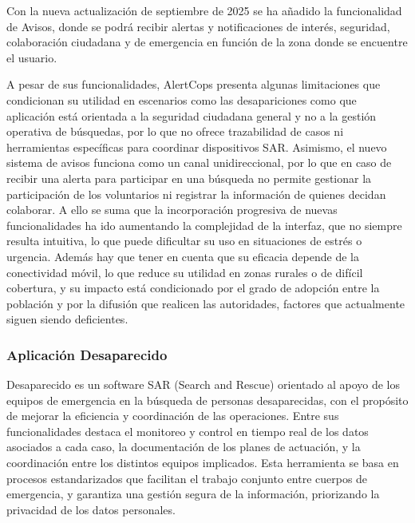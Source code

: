     Con la nueva actualización de septiembre de 2025 se ha añadido la funcionalidad de Avisos, donde se podrá recibir alertas y notificaciones de interés, seguridad, colaboración ciudadana y de emergencia en función de la zona donde se encuentre el usuario. 
    
    A pesar de sus funcionalidades, AlertCops presenta algunas limitaciones que condicionan su utilidad en escenarios como las desapariciones como que aplicación está orientada a la seguridad ciudadana general y no a la gestión operativa de búsquedas, por lo que no ofrece trazabilidad de casos ni herramientas específicas para coordinar dispositivos SAR. Asimismo, el nuevo sistema de avisos funciona como un canal unidireccional, por lo que en caso de recibir una alerta para participar en una búsqueda no permite gestionar la participación de los voluntarios ni registrar la información de quienes decidan colaborar. A ello se suma que la incorporación progresiva de nuevas funcionalidades ha ido aumentando la complejidad de la interfaz, que no siempre resulta intuitiva, lo que puede dificultar su uso en situaciones de estrés o urgencia. Además hay que tener en cuenta que su eficacia depende de la conectividad móvil, lo que reduce su utilidad en zonas rurales o de difícil cobertura, y su impacto está condicionado por el grado de adopción entre la población y por la difusión que realicen las autoridades, factores que actualmente siguen siendo deficientes.

    \subsubsection{Aplicación Desaparecido}


    
    Desaparecido es un software SAR (Search and Rescue) orientado al apoyo de los equipos de emergencia en la búsqueda de personas desaparecidas\cite{webDesaparecido, Github_DesaparecidoApp}, con el propósito de mejorar la eficiencia y coordinación de las operaciones. Entre sus funcionalidades destaca el monitoreo y control en tiempo real de los datos asociados a cada caso, la documentación de los planes de actuación, y la coordinación entre los distintos equipos implicados. Esta herramienta se basa en procesos estandarizados que facilitan el trabajo conjunto entre cuerpos de emergencia, y garantiza una gestión segura de la información, priorizando la privacidad de los datos personales. 
    
